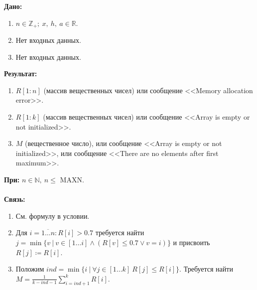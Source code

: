 \textbf{Дано:}
\begin{enumerate}
    \item \(n \in \mathbb{Z}_{+};\ x,\ h,\ a \in \mathbb{R}\).
    \item Нет входных данных.
    \item Нет входных данных.
\end{enumerate}
\noindent
\textbf{Результат:}
\begin{enumerate}
   \item \(R[1{:}n]\) (массив вещественных чисел) или сообщение <<Memory allocation error>>.
   \item \(R[1{:}k]\) (массив вещественных чисел) или сообщение <<Array is empty or not initialized>>.
   \item \(M\) (вещественное число), или сообщение <<Array is empty or not initialized>>, или сообщение <<There are no elements after first maximum>>.
\end{enumerate} 
\noindent
\textbf{При:} \(n \in \mathbb{N},\ n \leq\) MAXN.\\ \\  
\textbf{Связь:} 
\begin{enumerate}
    \item См. формулу в условии.
    \item Для \(i = \overline{1 \dots n}: R[i] > 0.7\) требуется найти \(j = \min\{v\ |\ v \in [1 \dots i] \land (R[v] \leq 0.7 \lor v = i)\}\) и присвоить \(R[j] \coloneqq R[i]\).
    \item Положим \(ind = \min\{i\ |\ \forall j \in [1 \dots k]\ R[j] \leq R[i]\}\). Требуется найти \(\displaystyle M = \frac{1}{k - ind - 1} \sum\limits_{i = ind+1}^{k}R[i]\).  
\end{enumerate}